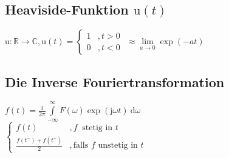 \documentclass[6pt,a4paper]{scrartcl}
\renewcommand{\i}{\ensuremath{\mathrm{j}}}										%
\newcommand{\ra}[0]{\ensuremath{\rightarrow}} 									%
\newcommand{\diff}{\ensuremath{\ \mathrm d}}									%
\newcommand{\heavi}{\ensuremath{\mathrm{u}}}									%
\newcommand{\R}{\ensuremath{\mathbb R}}
\newcommand{\C}{\ensuremath{\mathbb C}}
\begin{document}
\begin{multicols}{4}
	\subsection{Heaviside-Funktion $\heavi(t)$}
	$\heavi:\R \ra \C, \heavi(t) = \begin{cases} 1 &, t>0 \\ 0 & ,t<0 \end{cases}$ \qquad $\approx \lim\limits_{a \ra 0} \exp(-at)$\\
	
	\subsection{Die Inverse Fouriertransformation}
	$f(t) = \frac{1}{2\pi} \int\limits_{-\infty}^\infty F(\omega) \exp(\i \omega t) \diff \omega$\\
	$\begin{cases} f(t) & ,f\ \text{ stetig in }t \\ \frac{f(t^-) + f(t^+)}{2} & ,\text{falls } f\text{ unstetig in }t \end{cases}$
	
	
	

\end{multicols}
\end{document}
